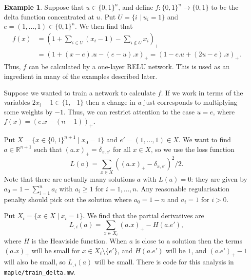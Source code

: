 \documentclass{amsart}
\newcommand{\R}         {{\mathbb{R}}}
\newcommand{\dl}        {\delta}
\newcommand{\sm}        {\setminus}
\newcommand{\st}        {\;|\;}
\renewcommand{\:}{\colon}
\theoremstyle{definition}
\newtheorem{example}[theorem]{Example}
\begin{document}
\begin{example}\label{eg-delta}
 Suppose that $u\in\{0,1\}^n$, and define $f\:\{0,1\}^n\to\{0,1\}$ to
 be the delta function concentrated at $u$.  Put $U=\{i\st u_i=1\}$
 and $e=(1,\dotsc,1)\in\{0,1\}^n$.  We then find that 
 \begin{align*}
  f(x) &=
   \left(1+\sum_{i\in U}(x_i-1)-\sum_{i\not\in U}x_i\right)_+  \\
  &= \left(1 + (x - e).u - (e-u).x\right)_+ 
   = \left(1-e.u+(2u-e).x\right)_+.
 \end{align*}
 Thus, $f$ can be calculated by a one-layer RELU network.  This is
 used as an ingredient in many of the examples described later.

 Suppose we wanted to train a network to calculate $f$.  If we work in
 terms of the variables $2x_i-1\in\{1,-1\}$ then a change in $u$ just
 corresponds to multiplying some weights by $-1$.  Thus, we can
 restrict attention to the case $u=e$, where $f(x)=(e.x-(n-1))_+$.  

 Put $X=\{x\in\{0,1\}^{n+1}\st x_0=1\}$ and $e'=(1,\dotsc,1)\in X$.
 We want to find $a\in\R^{n+1}$ such that $(a.x)_+=\dl_{x,e'}$ for all
 $x\in X$, so we use the loss function 
 \[ L(a) = \sum_{x\in X}((a.x)_+-\dl_{x,e'})^2/2. \]
 Note that there are actually many solutions $a$ with $L(a)=0$: they
 are given by $a_0=1-\sum_{i=1}^na_i$ with $a_i\geq 1$ for
 $i=1,\dotsc,n$.  Any reasonable regularisation penalty should pick
 out the solution where $a_0=1-n$ and $a_i=1$ for $i>0$.

 Put $X_i=\{x\in X\st x_i=1\}$.  We find that the partial derivatives
 are 
 \[ L_{,i}(a) = \sum_{x\in X_i}(a.x)_+ - H(a.e'), \]
 where $H$ is the Heaviside function.  When $a$ is close to a solution
 then the terms $(a.x)_+$ will be small for $x\in X_i\sm\{e'\}$, and
 $H(a.e')$ will be $1$, and $(a.e')_+-1$ will also be small, so
 $L_{,i}(a)$ will be small.  There is code for this analysis in
 \texttt{maple/train\_delta.mw}. 
\end{example}
\end{document}
